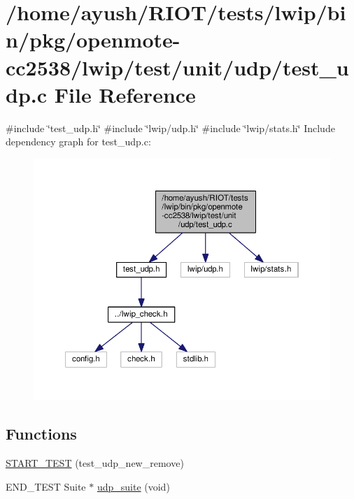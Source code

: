 \hypertarget{openmote-cc2538_2lwip_2test_2unit_2udp_2test__udp_8c}{}\section{/home/ayush/\+R\+I\+O\+T/tests/lwip/bin/pkg/openmote-\/cc2538/lwip/test/unit/udp/test\+\_\+udp.c File Reference}
\label{openmote-cc2538_2lwip_2test_2unit_2udp_2test__udp_8c}
{\ttfamily \#include \char`\"{}test\+\_\+udp.\+h\char`\"{}}\newline
{\ttfamily \#include \char`\"{}lwip/udp.\+h\char`\"{}}\newline
{\ttfamily \#include \char`\"{}lwip/stats.\+h\char`\"{}}\newline
Include dependency graph for test\+\_\+udp.\+c\+:
\nopagebreak
\begin{figure}[H]
\begin{center}
\leavevmode
\includegraphics[width=350pt]{openmote-cc2538_2lwip_2test_2unit_2udp_2test__udp_8c__incl}
\end{center}
\end{figure}
\subsection*{Functions}
\begin{DoxyCompactItemize}
\item 
\hyperlink{openmote-cc2538_2lwip_2test_2unit_2udp_2test__udp_8c_aa363cccfe8606ad26776f66110bad821}{S\+T\+A\+R\+T\+\_\+\+T\+E\+ST} (test\+\_\+udp\+\_\+new\+\_\+remove)
\item 
E\+N\+D\+\_\+\+T\+E\+ST Suite $\ast$ \hyperlink{openmote-cc2538_2lwip_2test_2unit_2udp_2test__udp_8c_aceb2ee7dda2a0cdb27aea23cf7c19e2a}{udp\+\_\+suite} (void)
\end{DoxyCompactItemize}


